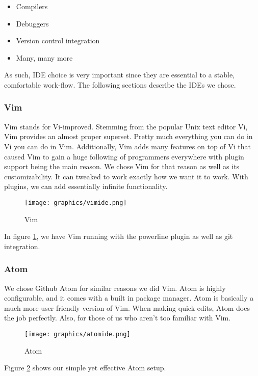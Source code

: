 \documentclass[letterpaper, 12pt]{article}
\begin{document}
\begin{itemize}
	\item Compilers
	\item Debuggers
	\item Version control integration
	\item Many, many more
\end{itemize}

As such, IDE choice is very important since they are essential to a stable, comfortable
work-flow. The following sections describe the IDEs we chose.

\subsubsection{Vim}

Vim stands for Vi-improved. Stemming from the popular Unix text editor Vi, Vim
provides an almost proper superset. Pretty much everything you can do in Vi you
can do in Vim. Additionally, Vim adds many features on top of Vi that caused Vim
to gain a huge following of programmers everywhere with plugin support being the main
reason. We chose Vim for that reason as well as its customizability. It can tweaked
to work exactly how we want it to work. With plugins, we can add essentially infinite
functionality.

\begin{figure}
    \centering
	\texttt{[image: graphics/vimide.png]}
    \caption{Vim} \label{vim}
\end{figure}

 In figure \ref{vim}, we have Vim running with the powerline plugin as
 well as git integration. 
 
\newpage

\subsubsection{Atom}
We chose Github Atom for similar reasons we did Vim. Atom is highly configurable, and it
comes with a built in package manager. Atom is basically a much more user friendly
version of Vim. When making quick edits, Atom does the job perfectly. Also, for
those of us who aren't too familiar with Vim.

\begin{figure}
    \centering
	\texttt{[image: graphics/atomide.png]}
    \caption{Atom} \label{atom}
\end{figure}

Figure \ref{atom} shows our simple yet effective Atom setup.
\end{document}
